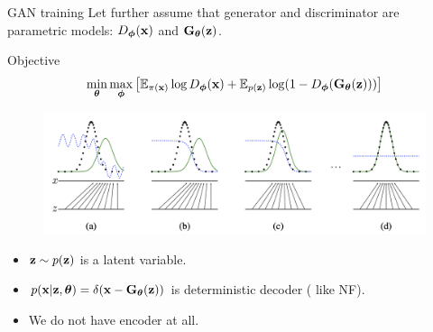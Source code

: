 \begin{frame}{GAN training}
	Let further assume that generator and discriminator are parametric models: $D_{\boldsymbol{\phi}}(\mathbf{x})$ and $\mathbf{G}_{\boldsymbol{\theta}}(\mathbf{z})$.
	\begin{block}{Objective}
		\vspace{-0.7cm}
		\[
		\min_{\boldsymbol{\theta}} \max_{\boldsymbol{\phi}} \left[ \mathbb{E}_{\pi(\mathbf{x})} \log D_{\boldsymbol{\phi}}(\mathbf{x}) + \mathbb{E}_{p(\mathbf{z})} \log (1 - D_{\boldsymbol{\phi}}(\mathbf{G}_{\boldsymbol{\theta}}(\mathbf{z}))) \right]
		\]
		\vspace{-0.7cm}
	\end{block}
	\begin{figure}
		\centering
		\includegraphics[width=1.0\linewidth]{figs/gan_1}
	\end{figure}

	\begin{itemize}
		\item $\mathbf{z} \sim p(\mathbf{z})$ is a latent variable.
		\item $p(\mathbf{x} | \mathbf{z}, \boldsymbol{\theta}) = \delta(\mathbf{x} - \mathbf{G}_{\boldsymbol{\theta}}(\mathbf{z}))$ is deterministic decoder ({\color{gray} like NF}).
		\item We do not have encoder at all.
	\end{itemize}

\end{frame}
